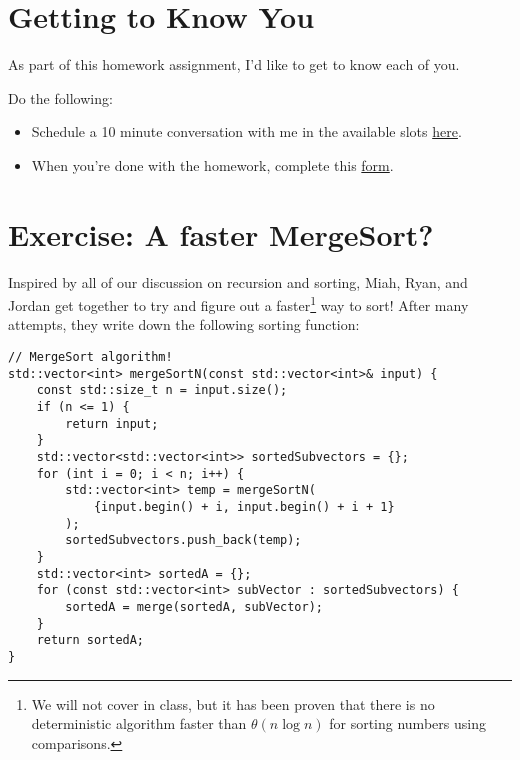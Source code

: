 \documentclass [12pt]{article}
\begin{document}
\section{Getting to Know You }

As part of this homework assignment, I'd like to get to know each of you.

Do the following:

\begin{itemize}
    \item {} Schedule a 10 minute conversation with me in the available slots \href{https://calendly.com/comp285-prof/get-to-know-you?month=2022-02}{here}.
    \item {} When you're done with the homework, complete this \href{https://forms.gle/KpC8RJ3gvkPgQPYY7}{form}.
\end{itemize}


\pagebreak
\section{Exercise: A faster MergeSort? }
Inspired by all of our discussion on recursion and sorting, Miah, Ryan, and Jordan get together to try and figure out a faster\footnote{We will not cover in class, but it has been proven that there is no deterministic algorithm faster than $\theta(n \log n)$ for sorting numbers using comparisons.} way to sort! After many attempts, they write down the following sorting function:

\vspace{2em}
\begin{verbatim}
// MergeSort algorithm!
std::vector<int> mergeSortN(const std::vector<int>& input) {
    const std::size_t n = input.size();
    if (n <= 1) {
        return input;
    }
    std::vector<std::vector<int>> sortedSubvectors = {};
    for (int i = 0; i < n; i++) {
        std::vector<int> temp = mergeSortN(
            {input.begin() + i, input.begin() + i + 1}
        );
        sortedSubvectors.push_back(temp);
    }
    std::vector<int> sortedA = {};
    for (const std::vector<int> subVector : sortedSubvectors) {
        sortedA = merge(sortedA, subVector);
    }
    return sortedA;
}
\end{verbatim}
\end{document}
